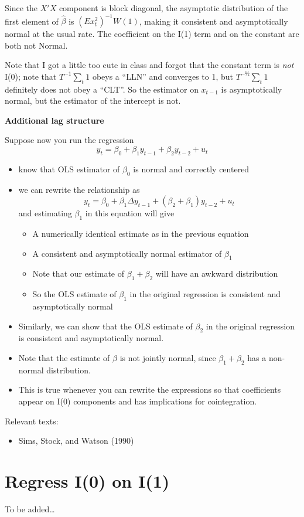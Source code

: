 Since the $X'X$ component is block diagonal, the asymptotic distribution
of the first element of $\hat β$ is $(E x_t^2)^{-1} W(1)$, making it
consistent and asymptotically normal at the usual rate. The coefficient
on the I(1) term and on the constant are both not Normal.

Note that I got a little too cute in class and forgot that the constant
term is \emph{not} I(0); note that $T^{-1} \sum_t 1$ obeys a ``LLN'' and
converges to 1, but $T^{-½} \sum_t 1$ definitely does not obey a ``CLT''.
So the estimator on $x_{t-1}$ is asymptotically normal, but the
estimator of the intercept is not.

\textbf{Additional lag structure}

Suppose now you run the regression
\[y_t = β_0 + β_1 y_{t-1} + β_2 y_{t-2} + u_t\]

\begin{itemize}
\item know that OLS estimator of $β_0$ is normal and correctly centered
\item we can rewrite the relationship as
  \[y_t = β_0 + β_1 Δy_{t-1} + (β_2 + β_1) y_{t-2} + u_t\] and
  estimating $β_1$ in this equation will give

  \begin{itemize}
  \item A numerically identical estimate as in the previous equation
  \item A consistent and asymptotically normal estimator of $β_1$
  \item Note that our estimate of $β_1 + β_2$ will have an awkward
    distribution
  \item So the OLS estimate of $β_1$ in the original regression is
    consistent and asymptotically normal
  \end{itemize}
\item Similarly, we can show that the OLS estimate of $β_2$ in the
  original regression is consistent and asymptotically normal.
\item Note that the estimate of $β$ is not jointly normal, since
  $β_1+β_2$ has a non-normal distribution.
\item This is true whenever you can rewrite the expressions so that
  coefficients appear on I(0) components and has implications for
  cointegration.
\end{itemize}

Relevant texts:
\begin{itemize}
\item Sims, Stock, and Watson (1990)
\end{itemize}

\section{Regress I(0) on I(1)}
To be added\ldots

